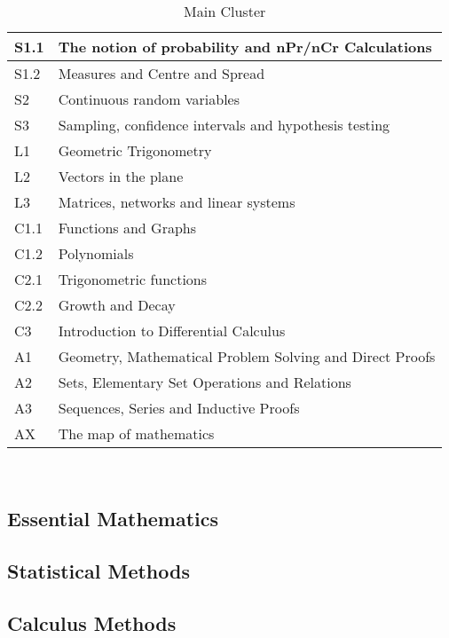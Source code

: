 \documentclass[12pt]{report}
\begin{document}
    \begin{table}[H]
        \centering
        \begin{tabular}{|l|l|}
        \hline
            S1.1 & The notion of probability and nPr/nCr Calculations \\ \hline
            S1.2 & Measures and Centre and Spread \\ \hline
            S2 & Continuous random variables \\ \hline
            S3 & Sampling, confidence intervals and hypothesis testing\\ \hline \hline \hline

            L1 & Geometric Trigonometry \\ \hline
            L2 & Vectors in the plane \\ \hline
            L3 & Matrices, networks and linear systems\\ \hline \hline \hline

            C1.1 & Functions and Graphs \\ \hline
            C1.2 & Polynomials \\ \hline
            C2.1 & Trigonometric functions \\ \hline
            C2.2 & Growth and Decay \\ \hline
            C3 & Introduction to Differential Calculus \\ \hline \hline \hline

            A1 & Geometry, Mathematical Problem Solving and Direct Proofs\\ \hline
            A2 & Sets, Elementary Set Operations and Relations\\ \hline
            A3 & Sequences, Series and Inductive Proofs\\ \hline
            AX & The map of mathematics\\ \hline
        \end{tabular}\\
        \caption{Main Cluster}
    \end{table}

\subsection{Essential Mathematics}
\subsection{Statistical Methods}
\subsection{Calculus Methods}
\end{document}
